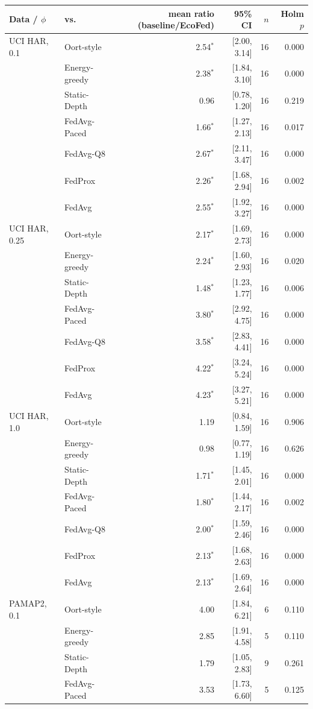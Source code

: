 \begin{tabular}{@{}llrrrr@{}}
\toprule
Data / $\phi$ & vs. & mean ratio (baseline/EcoFed) & 95\% CI & $n$ & Holm $p$\\
\midrule
UCI HAR, 0.1 & Oort-style & 2.54$^{*}$ & [2.00, 3.14] & 16 & 0.000\\
 & Energy-greedy & 2.38$^{*}$ & [1.84, 3.10] & 16 & 0.000\\
 & Static-Depth & 0.96 & [0.78, 1.20] & 16 & 0.219\\
 & FedAvg-Paced & 1.66$^{*}$ & [1.27, 2.13] & 16 & 0.017\\
 & FedAvg-Q8 & 2.67$^{*}$ & [2.11, 3.47] & 16 & 0.000\\
 & FedProx & 2.26$^{*}$ & [1.68, 2.94] & 16 & 0.002\\
 & FedAvg & 2.55$^{*}$ & [1.92, 3.27] & 16 & 0.000\\
\midrule
UCI HAR, 0.25 & Oort-style & 2.17$^{*}$ & [1.69, 2.73] & 16 & 0.000\\
 & Energy-greedy & 2.24$^{*}$ & [1.60, 2.93] & 16 & 0.020\\
 & Static-Depth & 1.48$^{*}$ & [1.23, 1.77] & 16 & 0.006\\
 & FedAvg-Paced & 3.80$^{*}$ & [2.92, 4.75] & 16 & 0.000\\
 & FedAvg-Q8 & 3.58$^{*}$ & [2.83, 4.41] & 16 & 0.000\\
 & FedProx & 4.22$^{*}$ & [3.24, 5.24] & 16 & 0.000\\
 & FedAvg & 4.23$^{*}$ & [3.27, 5.21] & 16 & 0.000\\
\midrule
UCI HAR, 1.0 & Oort-style & 1.19 & [0.84, 1.59] & 16 & 0.906\\
 & Energy-greedy & 0.98 & [0.77, 1.19] & 16 & 0.626\\
 & Static-Depth & 1.71$^{*}$ & [1.45, 2.01] & 16 & 0.000\\
 & FedAvg-Paced & 1.80$^{*}$ & [1.44, 2.17] & 16 & 0.002\\
 & FedAvg-Q8 & 2.00$^{*}$ & [1.59, 2.46] & 16 & 0.000\\
 & FedProx & 2.13$^{*}$ & [1.68, 2.63] & 16 & 0.000\\
 & FedAvg & 2.13$^{*}$ & [1.69, 2.64] & 16 & 0.000\\
\midrule
PAMAP2, 0.1 & Oort-style & 4.00 & [1.84, 6.21] & 6 & 0.110\\
 & Energy-greedy & 2.85 & [1.91, 4.58] & 5 & 0.110\\
 & Static-Depth & 1.79 & [1.05, 2.83] & 9 & 0.261\\
 & FedAvg-Paced & 3.53 & [1.73, 6.60] & 5 & 0.125\\

\end{tabular}

